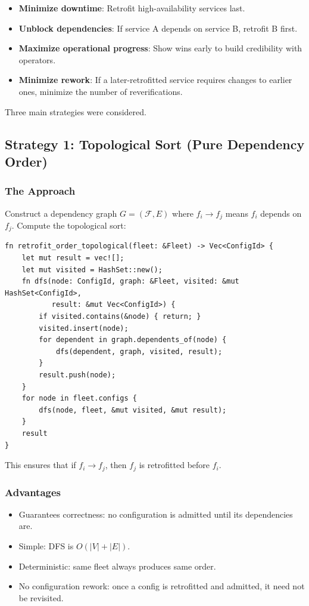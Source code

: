 \begin{itemize}
  \item \textbf{Minimize downtime}: Retrofit high-availability services last.
  \item \textbf{Unblock dependencies}: If service A depends on service B, retrofit B first.
  \item \textbf{Maximize operational progress}: Show wins early to build credibility with operators.
  \item \textbf{Minimize rework}: If a later-retrofitted service requires changes to earlier ones, minimize the number of reverifications.
\end{itemize}

Three main strategies were considered.

\subsection{Strategy 1: Topological Sort (Pure Dependency Order)}

\subsubsection{The Approach}

Construct a dependency graph $G = (\mathcal{F}, E)$ where $f_i \to f_j$ means $f_i$ depends on $f_j$. Compute the topological sort:

\begin{lstlisting}[caption={Topological sort retrofit order}]
fn retrofit_order_topological(fleet: &Fleet) -> Vec<ConfigId> {
    let mut result = vec![];
    let mut visited = HashSet::new();
    fn dfs(node: ConfigId, graph: &Fleet, visited: &mut HashSet<ConfigId>,
           result: &mut Vec<ConfigId>) {
        if visited.contains(&node) { return; }
        visited.insert(node);
        for dependent in graph.dependents_of(node) {
            dfs(dependent, graph, visited, result);
        }
        result.push(node);
    }
    for node in fleet.configs {
        dfs(node, fleet, &mut visited, &mut result);
    }
    result
}
\end{lstlisting}

This ensures that if $f_i \to f_j$, then $f_j$ is retrofitted before $f_i$.

\subsubsection{Advantages}

\begin{itemize}
  \item Guarantees correctness: no configuration is admitted until its dependencies are.
  \item Simple: DFS is $O(|V| + |E|)$.
  \item Deterministic: same fleet always produces same order.
  \item No configuration rework: once a config is retrofitted and admitted, it need not be revisited.
\end{itemize}

